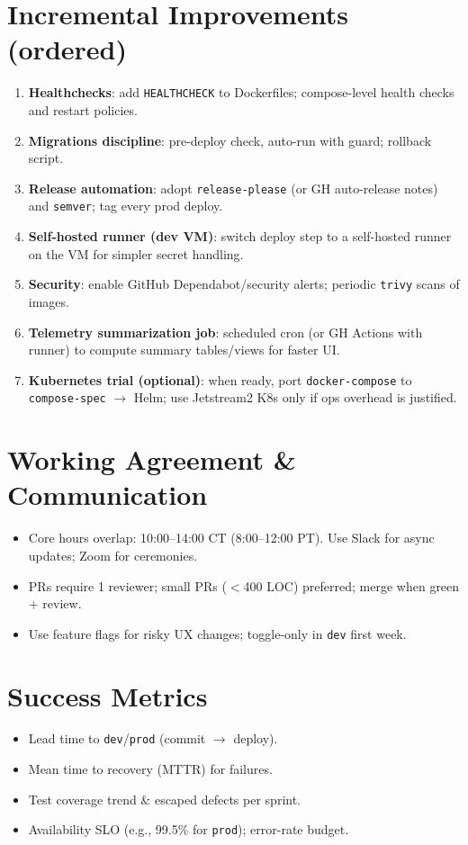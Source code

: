 \documentclass[11pt]{article}
\begin{document}
\section{Incremental Improvements (ordered)}
\begin{enumerate}[leftmargin=1.2em]
  \item \textbf{Healthchecks}: add \texttt{HEALTHCHECK} to Dockerfiles; compose-level health checks and restart policies.
  \item \textbf{Migrations discipline}: pre-deploy check, auto-run with guard; rollback script.
  \item \textbf{Release automation}: adopt \texttt{release-please} (or GH auto-release notes) and \texttt{semver}; tag every prod deploy.
  \item \textbf{Self-hosted runner (dev VM)}: switch deploy step to a self-hosted runner on the VM for simpler secret handling.
  \item \textbf{Security}: enable GitHub Dependabot/security alerts; periodic \texttt{trivy} scans of images.
  \item \textbf{Telemetry summarization job}: scheduled cron (or GH Actions with runner) to compute summary tables/views for faster UI.
  \item \textbf{Kubernetes trial (optional)}: when ready, port \texttt{docker-compose} to \texttt{compose-spec} \(\rightarrow\) Helm; use Jetstream2 K8s only if ops overhead is justified.
\end{enumerate}

\section{Working Agreement \& Communication}
\begin{itemize}[leftmargin=1.2em]
  \item Core hours overlap: 10:00--14:00 CT (8:00--12:00 PT). Use Slack for async updates; Zoom for ceremonies.
  \item PRs require 1 reviewer; small PRs ($<$400 LOC) preferred; merge when green + review.
  \item Use feature flags for risky UX changes; toggle-only in \texttt{dev} first week.
\end{itemize}

\section{Success Metrics}
\begin{itemize}[leftmargin=1.2em]
  \item Lead time to \texttt{dev}/\texttt{prod} (commit \(\rightarrow\) deploy).
  \item Mean time to recovery (MTTR) for failures.
  \item Test coverage trend \& escaped defects per sprint.
  \item Availability SLO (e.g., 99.5\% for \texttt{prod}); error-rate budget.
\end{itemize}
\end{document}
